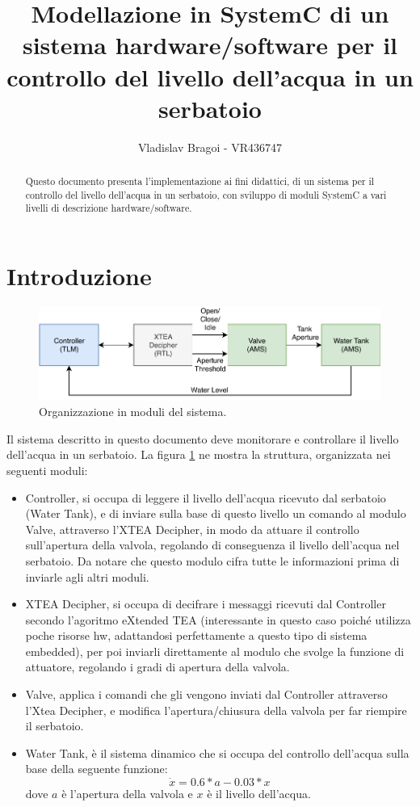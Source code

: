\documentclass[]{IEEEtran}
\title{Modellazione in SystemC di un sistema hardware/software per il controllo del livello dell'acqua in un serbatoio}
\author{Vladislav Bragoi - VR436747}
\begin{document}
\maketitle

\begin{abstract}
Questo documento presenta l'implementazione ai fini didattici, di un sistema per il controllo del livello dell'acqua in 
un serbatoio, con sviluppo di moduli SystemC a vari livelli di descrizione hardware/software.
\end{abstract}

\section{Introduzione} \label{sec:intro}
\begin{figure}[bt]
	\centering
	\includegraphics[width=\columnwidth]{figures/system.pdf}
	\caption{Organizzazione in moduli del sistema.}
	\label{fig:system}
\end{figure}

Il sistema descritto in questo documento deve monitorare e controllare il livello dell'acqua in un serbatoio. La figura 
\ref{fig:system} ne mostra la struttura, organizzata nei seguenti moduli:
\begin{itemize}
    \item Controller, si occupa di leggere il livello dell'acqua ricevuto dal serbatoio (Water Tank), e di inviare sulla 
    base di questo livello un comando al modulo Valve, attraverso l'XTEA Decipher, in modo da attuare il controllo 
    sull'apertura della valvola, regolando di conseguenza il livello dell'acqua nel serbatoio. Da notare che questo 
    modulo cifra tutte le informazioni prima di inviarle agli altri moduli.
    
    \item XTEA Decipher, si occupa di decifrare i messaggi ricevuti dal Controller secondo l'agoritmo eXtended TEA 
    (interessante in questo caso poich\'e utilizza poche risorse hw, adattandosi perfettamente a questo tipo di sistema 
    embedded), per poi inviarli direttamente al modulo che svolge la funzione di attuatore, regolando i gradi di apertura
    della valvola.
    
    \item Valve, applica i comandi che gli vengono inviati dal Controller attraverso l'Xtea Decipher, e modifica 
    l'apertura/chiusura della valvola per far riempire il serbatoio.
    
    \item Water Tank, \`e il sistema dinamico che si occupa del controllo dell'acqua sulla base della seguente funzione:
     \[\dot{x} = 0.6 * a - 0.03 * x\]
     dove $a$ \`e l'apertura della valvola e $x$ \`e il livello dell'acqua.
\end{itemize}
\end{document}
